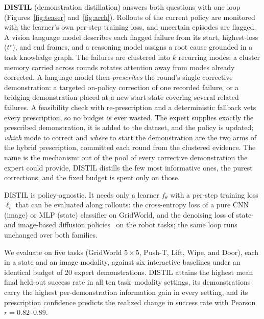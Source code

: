 \documentclass[letterpaper]{article} %
\begin{document}
\textbf{DISTIL} (demonstration distillation) answers both questions with one
loop (Figures~\ref{fig:teaser} and~\ref{fig:arch}). Rollouts of the current
policy are monitored with the learner's own per-step training loss, and
uncertain episodes are flagged. A vision language model describes each
flagged failure from its start, highest-loss ($t^\star$), and end frames, and
a reasoning model assigns a root cause grounded in a task knowledge
graph. The failures are
clustered into $k$ recurring modes; a cluster memory carried across
rounds rotates attention away from modes already corrected. A language model
then \emph{prescribes} the round's single corrective demonstration: a
targeted on-policy correction of one recorded failure, or a bridging
demonstration placed at a new start state covering several related
failures. A feasibility check with re-prescription and a
deterministic fallback vets every prescription, so no budget is ever wasted. The expert supplies
exactly the prescribed demonstration, it is added to the dataset, and the
policy is updated; \emph{which} mode to correct and \emph{where} to start
the demonstration are the two arms of the hybrid prescription, committed
each round from the clustered evidence. The name is the mechanism: out of
the pool of every corrective demonstration the expert could provide, DISTIL
distills the few most informative ones, the purest corrections, and the
fixed budget is spent only on those.

DISTIL is policy-agnostic. It needs only a learner $f_\theta$ with a per-step
training loss $\ell_t$ that can be evaluated along rollouts: the cross-entropy
loss of a pure CNN (image) or MLP (state) classifier on GridWorld, and the
denoising loss of state- and image-based diffusion
policies~\citep{chi2023diffusionpolicy} on the robot tasks; the same loop
runs unchanged over both families.

We evaluate on five tasks (GridWorld $5{\times}5$, Push-T, Lift, Wipe, and
Door), each in a state and an image modality, against six interactive
baselines under an identical budget of 20 expert demonstrations. DISTIL
attains the highest mean final held-out success rate in all ten
task--modality settings, its demonstrations carry the highest
per-demonstration information gain in every setting, and its prescription
confidence predicts the realized change in success rate with Pearson
$r=0.82$--$0.89$.
\end{document}
